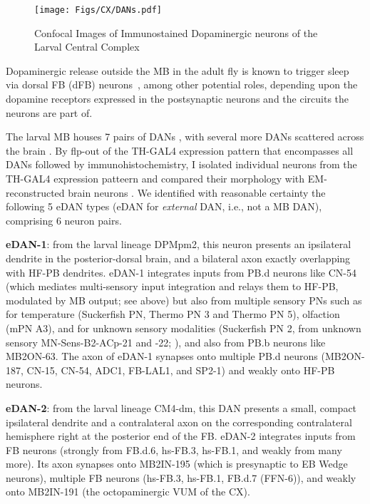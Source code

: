    \begin{figure}
        \centering
        \texttt{[image: Figs/CX/DANs.pdf]}
        \caption{Confocal Images of Immunostained Dopaminergic neurons of the Larval Central Complex}
        \label{DANs}
    \end{figure}

Dopaminergic release outside the MB in the adult fly is known to trigger sleep via dorsal FB (dFB) neurons~\citep{pimentel2016sleep}, among other potential roles, depending upon the dopamine receptors expressed in the postsynaptic neurons and the circuits the neurons are part of.

The larval MB houses 7 pairs of DANs \citep{eichler2017complete}, with several more DANs scattered across the brain \citep{selcho2009thgal4}. By flp-out of the TH-GAL4 expression pattern that encompasses all DANs \citep{selcho2009thgal4} followed by immunohistochemistry, I isolated individual neurons from the TH-GAL4 expression patteern and compared their morphology with EM-reconstructed brain neurons \citep{winding2023connectome}. We identified with reasonable certainty the following 5 eDAN types (eDAN for \textit{external} DAN, i.e., not a MB DAN), comprising 6 neuron pairs.

\textbf{eDAN-1}: from the larval lineage DPMpm2, this neuron presents an ipsilateral dendrite in the posterior-dorsal brain, and a bilateral axon exactly overlapping with HF-PB dendrites. eDAN-1 integrates inputs from PB.d neurons like CN-54 (which mediates multi-sensory input integration and relays them to HF-PB, modulated by MB output; see above) but also from multiple sensory PNs such as for temperature (Suckerfish PN, Thermo PN 3 and Thermo PN 5), olfaction (mPN A3), and for unknown sensory modalities (Suckerfish PN 2, from unknown sensory MN-Sens-B2-ACp-21 and -22; \citep{miroschnikow2018convergence}), and also from PB.b neurons like MB2ON-63. The axon of eDAN-1 synapses onto multiple PB.d neurons (MB2ON-187, CN-15, CN-54, ADC1, FB-LAL1, and SP2-1) and weakly onto HF-PB neurons.

\textbf{eDAN-2}: from the larval lineage CM4-dm, this DAN presents a small, compact ipsilateral dendrite and a contralateral axon on the corresponding contralateral hemisphere right at the posterior end of the FB. eDAN-2 integrates inputs from FB neurons (strongly from FB.d.6, hs-FB.3, hs-FB.1, and weakly from many more). Its axon synapses onto MB2IN-195 (which is presynaptic to EB Wedge neurons), multiple FB neurons (hs-FB.3, hs-FB.1, FB.d.7 (FFN-6)), and weakly onto MB2IN-191 (the octopaminergic VUM of the CX).

